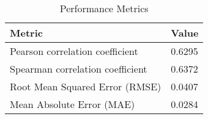 \documentclass{article}
\begin{document}
\begin{table}[h!]
\centering
\begin{tabular}{ll}
\toprule
Metric & Value \\
\midrule
Pearson correlation coefficient & 0.6295 \\
Spearman correlation coefficient & 0.6372 \\
Root Mean Squared Error (RMSE) & 0.0407 \\
Mean Absolute Error (MAE) & 0.0284 \\
\bottomrule
\end{tabular}
\caption{Performance Metrics}
\label{tab:metrics}
\end{table}
\end{document}
